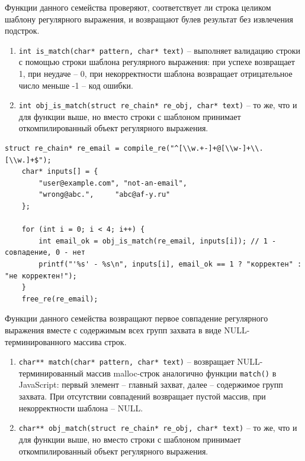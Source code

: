 
Функции данного семейства проверяют, соответствует ли строка целиком шаблону регулярного выражения, и возвращают булев результат без извлечения подстрок.

\begin{enumerate}
	\item \verb`int is_match(char* pattern, char* text)` -- выполняет валидацию строки с помощью строки шаблона регулярного выражения: при успехе возвращает 1, при неудаче -- 0, при некорректности шаблона возвращает отрицательное число меньше -1 -- код ошибки.
	
	\item \verb`int obj_is_match(struct re_chain* re_obj, char* text)` -- то же, что и для функции выше, но вместо строки с шаблоном принимает откомпилированный объект регулярного выражения.
\end{enumerate}

\begin{lstlisting}[caption={Валидация e-mail адресов}]
	struct re_chain* re_email = compile_re("^[\\w.+-]+@[\\w-]+\\.[\\w.]+$");
	char* inputs[] = {
		"user@example.com", "not-an-email",
		"wrong@abc.",     "abc@af-y.ru"
	};
	
	for (int i = 0; i < 4; i++) {
		int email_ok = obj_is_match(re_email, inputs[i]); // 1 - совпадение, 0 - нет
		printf("'%s' - %s\n", inputs[i], email_ok == 1 ? "корректен" : "не корректен!");
	}
	free_re(re_email);
\end{lstlisting}


Функции данного семейства возвращают первое совпадение регулярного выражения вместе с содержимым всех групп захвата в виде NULL-терминированного массива строк.

\begin{enumerate}
	\item \verb`char** match(char* pattern, char* text)` -- возвращает NULL-терминированный массив malloc-строк аналогично функции \verb`match()` в JavaScript: первый элемент -- главный захват, далее -- содержимое групп захвата. При отсутствии совпадений возвращает пустой массив, при некорректности шаблона -- NULL.
	
	\item \verb`char** obj_match(struct re_chain* re_obj, char* text)` -- то же, что и для функции выше, но вместо строки с шаблоном принимает откомпилированный объект регулярного выражения.
\end{enumerate}

